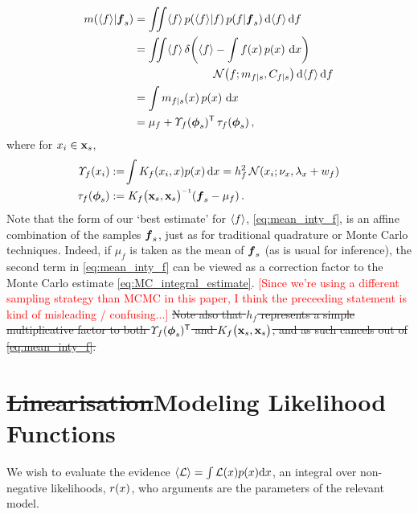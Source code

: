 \documentclass{article}
\begin{document}
\begin{align} \label{eq:mean_inty_f}
\mean{\inty{f}}{\vf_s}
& 
=\iint \inty{f}\,\p{\inty{f}}{f}\p{f}{\vf_s} \ud \inty{f} \,\ud f                                                                                                                                                               \nonumber\\
&
 =\iint \inty{f}\,\dd{\inty{f}}{\int f(\lfv)\,\po{\lfv}\,\ud\lfv}
\nonumber\\
&\hspace{2.5cm}
\N{f}{\meancondfn{f}{s}}{\covcondfn{f}{s}} \ud \inty{f} \,\ud f \nonumber\\
&
 = \int \meancondfn{f}{s}(\lfv)\,\po{\lfv}\,\ud\lfv\nonumber\\
&
 = 
\mu_f + \ntT{s}{f}\, \dtt{s}{f}
\,,
\end{align}
where for $\lfv_i \in \vlfv_s$,
\begin{align*}
\fnt{\lfv_i}{f} & \deq \!\int K_f(\lfv_i,\lfv)\po{\lfv}\ud\lfv
 = h_f^2\,\N{\lfv_i}{\nu_{\lfv}}{\lambda_{\lfv}+w_{f}}\\
\dtt{s}{f} & \deq K_{f}\bigl(\vlfv_s,\vlfv_s\bigr)\inv (\vf_s-{\mu}_{f})\,.
\end{align*}
Note that the form of our `best estimate' for $\inty{f}$, \eqref{eq:mean_inty_f}, is an affine combination of the samples $\vf_s$, just as for traditional quadrature or Monte Carlo techniques. Indeed, if $\mu_f$ is taken as the mean of $\vf_s$ (as is usual for \gpb inference), the second term in \eqref{eq:mean_inty_f} can be viewed as a correction factor to the Monte Carlo estimate \eqref{eq:MC_integral_estimate}. \textcolor{red}{[Since we're using a different sampling strategy than MCMC in this paper, I think the preceeding statement is kind of misleading / confusing...]}
\sout{Note also that $h_f$ represents a simple multiplicative factor to both $\ntT{s}{f}$ and $K_{f}\bigl(\vlfv_s,\vlfv_s\bigr)$, and as such cancels out of \eqref{eq:mean_inty_f}.} 



\section{{\sout{Linearisation}}Modeling Likelihood Functions}

We wish to evaluate the evidence $\inty{\lfn} = \int \lfn(\lfv) p(\lfv) \ud\lfv$, an integral over non-negative likelihoods, $r(\lfv)$, who arguments are the parameters of the relevant model.
\end{document}

